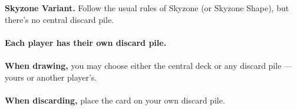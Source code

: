 \documentclass[a4paper]{memoir}
\begin{document}
{\footnotesize

\noindent
\textbf{ Skyzone Variant.}  
Follow the usual rules of Skyzone (or Skyzone Shape), but there’s no central discard pile.
\\
\\
\noindent
\textbf{Each player has their own discard pile.}
\\
\\
\textbf{When drawing,} you may choose either the central deck or any discard pile — yours or another player’s.
\\
\\
\textbf{When discarding,} place the card on your own discard pile.
}
\end{document}
